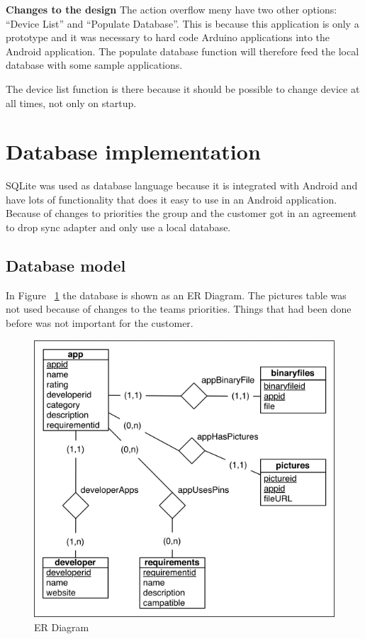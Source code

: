 	\textbf{Changes to the design}
	The action overflow meny have two other options: ``Device List'' and ``Populate Database''. This is because this application is only a prototype and it was necessary to hard code Arduino applications into the Android application. The populate database function will therefore feed the local database with some sample applications.

	The device list function is there because it should be possible to change device at all times, not only on startup.

\section{Database implementation}

	SQLite was used as database language because it is integrated with Android and have lots of functionality that does it easy to use in an Android application. Because of changes to priorities the group and the customer got in an agreement to drop sync adapter and only use a local database.

	\subsection{Database model}

		In Figure ~\ref{fig:erdiagram} the database is shown as an ER Diagram. The pictures table was not used because of changes to the teams priorities. Things that had been done before was not important for the customer.

		\begin{figure}[H]
		\includegraphics[scale=1]{images/ER_Diagram.png}
		\caption{ER Diagram}
		\label{fig:erdiagram}
		\end{figure}


